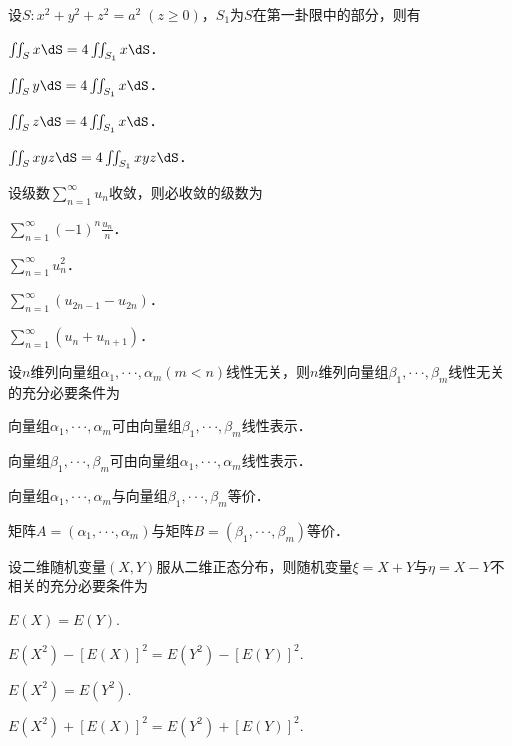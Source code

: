\documentclass[plain,noanswer,medmath]{../../template/jnuexam}
\begin{document}
\begin{problem}
设$S: x^2 + y^2 + z^2 = a^2\;(z \ge 0)$，$S_1$为$S$在第一卦限中的部分，则有\pickout{}
\begin{abcd}
\item $\iint_S x\dS = 4\iint_{S_1} x\dS$．
\item $\iint_S y\dS = 4\iint_{S_1} x\dS$．
\item $\iint_S z\dS = 4\iint_{S_1} x\dS$．
\item $\iint_S xyz\dS = 4\iint_{S_1} xyz\dS$．
\end{abcd}
\end{problem}


\begin{problem}
设级数$\sum_{n = 1}^{\infty}u_n$收敛，则必收敛的级数为\pickout{}
\begin{abcd}
\item $\sum_{n = 1}^{\infty}(- 1)^n\frac{u_n}{n}$．
\item $\sum_{n = 1}^{\infty}u_n^2$．
\item $\sum_{n = 1}^{\infty}(u_{2n - 1} - u_{2n})$．
\item $\sum_{n = 1}^{\infty}(u_n + u_{n + 1})$．
\end{abcd}
\end{problem}


\begin{problem}
设$n$维列向量组$\alpha_1, \cdot \cdot \cdot ,\alpha_m(m < n)$线性无关，则$n$维列向量组$\beta_1, \cdot \cdot \cdot ,\beta_m$线性无关的充分必要条件为\pickout{}
\begin{abcd}
\item 向量组$\alpha_1, \cdot \cdot \cdot ,\alpha_m$可由向量组$\beta_1, \cdot \cdot \cdot ,\beta_m$线性表示．
\item 向量组$\beta_1, \cdot \cdot \cdot ,\beta_m$可由向量组$\alpha_1, \cdot \cdot \cdot ,\alpha_m$线性表示．
\item 向量组$\alpha_1, \cdot \cdot \cdot ,\alpha_m$与向量组$\beta_1, \cdot \cdot \cdot ,\beta_m$等价．
\item 矩阵$A = \left(\alpha_1, \cdot \cdot \cdot ,\alpha_m \right)$与矩阵$B = \left(\beta_1, \cdot \cdot \cdot ,\beta_m \right)$等价．
\end{abcd}
\end{problem}


\begin{problem}
设二维随机变量$\left(X,Y \right)$服从二维正态分布，则随机变量$\xi = X + Y$与$\eta = X - Y$不相关的充分必要条件为\pickout{}
\begin{abcd}
\item $E(X) = E(Y).$
\item $E(X^2) - \left[E(X) \right]^2 = E(Y^2) - \left[E(Y) \right]^2.$
\item $E(X^2) = E(Y^2).$
\item $E(X^2) + \left[E(X) \right]^2 = E(Y^2) + \left[E(Y) \right]^2.$
\end{abcd}
\end{problem}
\end{document}
